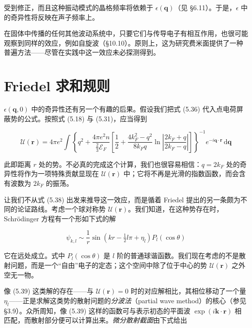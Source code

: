 受到修正，而且这种振动模式的晶格频率将依赖于 $\epsilon(\mathbf{q})$（见 §6.11）。于是，$\epsilon$ 中的奇异性将反映在声子频率上。

在固体中传播的任何其他波动系统中，只要它们与传导电子有相互作用，也很可能观察到同样的效应，例如自旋波（§10.10）。原则上，这为研究费米面提供了一种普遍方法——尽管在实践中这一效应未必探测得到。

\section{Friedel 求和规则}

$\epsilon(\mathbf{q},0)$ 中的奇异性还有另一个有趣的后果。假设我们把式 (5.36) 代入点电荷屏蔽势的公式。按照式 (5.18) 与 (5.31)，应当得到

\begin{equation*}
\mathcal{U}(\mathbf{r}) = 4\pi e^2 \int \left\{ q^2 + \frac{4\pi e^2 n}{\frac{2}{3}\mathcal{E}_F} \left[ \frac{1}{2} + \frac{4k_F^2 - q^2}{8k_F q} \ln\left| \frac{2k_F + q}{2k_F - q} \right| \right] \right\}^{-1} e^{-i\mathbf{q}\cdot\mathbf{r}} \,\mathrm{d}\mathbf{q}
\tag{5.38}
\end{equation*}

此即距离 $r$ 处的势。不必真的完成这个计算，我们也很容易相信：$q = 2k_F$ 处的奇异性将作为一项特殊贡献显现在 $\mathcal{U}(\mathbf{r})$ 中；它将不再是光滑的指数函数，而会含有波数为 $2k_F$ 的振荡。

让我们不从式 (5.38) 出发来推导这一效应，而是循着 Friedel 提出的另一条颇为不同的论证路线。考虑一个球对称势 $\mathcal{U}(\mathbf{r})$。我们知道，在这种势存在时，Schrödinger 方程有一个形如下式的解

\begin{equation*}
\psi_{k,l} \sim \frac{1}{r} \sin\left( kr - \tfrac{1}{2}l\pi + \eta_l \right) P_l(\cos\theta)
\tag{5.39}
\end{equation*}

它在远处成立。式中 $P_l(\cos\theta)$ 是 $l$ 阶的普通球谐函数。我们现在考虑的不是散射问题，而是一个“自由”电子的定态；这个空间中除了位于中心的势 $\mathcal{U}(\mathbf{r})$ 之外空无一物。

像 (5.39) 这类解的存在——与 $\mathcal{U}(\mathbf{r}) = 0$ 时的对应解相比，其相位移动了一个量 $\eta_l$——正是求解这类势的散射问题的\emph{分波法}（partial wave method）的核心（参见 §3.9）。众所周知，像 (5.39) 这样的函数可与表示初态的平面波 $\exp(i\mathbf{k}\cdot\mathbf{r})$ 相匹配，而散射部分便可以计算出来。\emph{微分散射截面}由下式给出

